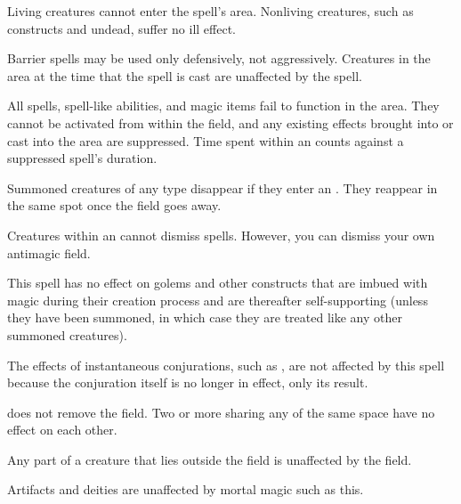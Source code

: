 \begin{spellheader}
\end{spellheader}
\begin{spelleffects}
    \spelleffect Living creatures cannot enter the spell's area. Nonliving creatures, such as constructs and undead, suffer no ill effect.
    \spelldur{\durlong \dismissable}
\end{spelleffects}
\begin{spellfooter}
    \spellnotes Barrier spells may be used only defensively, not aggressively. Creatures in the area at the time that the spell is cast are unaffected by the spell.
\end{spellfooter}

\begin{spellheader}
    \spelldur{\durlong \dismissable}
\end{spellheader}
\begin{spelleffects}
    \spelleffect All spells, spell-like abilities, and magic items fail to function in the area. They cannot be activated from within the field, and any existing effects brought into or cast into the area are suppressed. Time spent within an  counts against a suppressed spell's duration.
    \par Summoned creatures of any type disappear if they enter an . They reappear in the same spot once the field goes away. 
    \par Creatures within an  cannot dismiss spells. However, you can dismiss your own antimagic field.
\end{spelleffects}
\begin{spellfooter}
    \spellnotes This spell has no effect on golems and other constructs that are imbued with magic during their creation process and are thereafter self-supporting (unless they have been summoned, in which case they are treated like any other summoned creatures).

    The effects of instantaneous conjurations, such as , are not affected by this spell because the conjuration itself is no longer in effect, only its result.

    \par {} does not remove the field. Two or more  sharing any of the same space have no effect on each other.
    \par Any part of a creature that lies outside the field is unaffected by the field.
    \par Artifacts and deities are unaffected by mortal magic such as this. 
\end{spellfooter}

